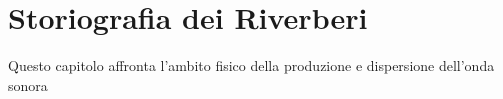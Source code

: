 
\chapter{Storiografia dei Riverberi}
\label{chp:Storiografia dei Riverberi}

Questo capitolo affronta l'ambito fisico della produzione e dispersione dell'onda sonora